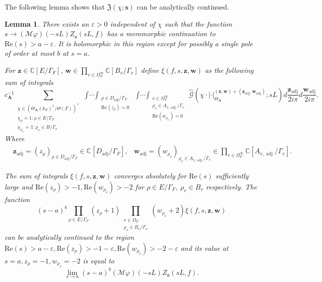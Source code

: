 \documentclass[a4paper,11pt,reqno]{amsart}
\newcommand{\C}{\mathbb{C}}
\newcommand{\A}{\mathbb{A}}
\DeclareMathOperator{\adj}{adj}
\renewcommand{\Re}{\mathrm{Re}}
\newtheorem{lemma}[theorem]{Lemma}
\theoremstyle{definition}
\begin{document}
The following lemma shows that $\mathfrak{Z}(\chi ; \bm{s})$ can be analytically continued.
\begin{lemma}\label{lem: Moving the contours}
	There exists an $\varepsilon > 0$ independent of $\chi$ such that the function $s \to (\mathcal{M} \varphi)(-sL )Z_{\mathfrak{a}}(s L, f)$ has a meromorphic continuation to $\Re(s) > a - \varepsilon$. It is holomorphic in this region except for possibly a single pole of order at most $b$ at $s = a$.
	
	For $\bm{z} \in \C[E / \Gamma_F]$, $\bm{w} \in \prod_{v \in \Omega_{F}^{\infty}} \C[B_v/\Gamma_v]$ define $\xi(f, s, \bm{z}, \bm{w})$ as the following sum of integrals
	\begin{equation}\label{eq:Definition of xi}
		c_{\mathbf{A}}^{-1}
		\sum_{\substack{\chi \in (\Theta_{\mathbf{A}}(\A_F)^1/\Theta(F))^{\vee} \\ \chi_{\rho} = 1: \rho \in E/\Gamma_F \\ \chi_{\rho_v} = 1: \rho_v \in B/\Gamma_v}}
		\mathop{\int \cdots \int}_{\substack{\rho \in D_{\adj} / \Gamma_F \\ \Re(z_{\rho}) = 0}}\mathop{\int \cdots \int}_{\substack{v \in \Omega_F^{\infty} \\ \rho_v \in A_{v, \adj} /\Gamma_v \\ \Re(w_{\rho_v}) = 0}} 
		\hat{\mathcal{G}}(\chi \cdot | \cdot|_{\Theta_{\mathbf{A}}}^{(\bm{z}, \bm{w}) + (\bm{z}_{\adj}, \bm{w}_{\adj})}; s L) d\frac{\bm{z}_{\adj}}{2 i \pi} d \frac{\bm{w}_{\adj}}{2 i \pi}.
	\end{equation}
	Where 
	\begin{align*}
		&\bm{z}_{\adj} = (z_{\rho})_{\rho \in D_{\adj} / \Gamma_F} \in \C[D_{\adj} / \Gamma_F], &\bm{w}_{\adj} = (w_{\rho_v})_{\rho_v \in A_{v, \adj}/\Gamma_v} \in \prod_{v \in \Omega_{F}^{\infty}} \C[A_{v, \adj}/\Gamma_v].
	\end{align*}
	
	The sum of integrals $\xi(f, s, \bm{z}, \bm{w})$ converges absolutely for $\Re(s)$ sufficiently large and $\Re(z_{\rho}) > -1, \Re(w_{\rho_v}) > -2$ for $\rho \in E/ \Gamma_F$, $\rho_v \in B_v$ respectively. The function 
	\[
	(s - a)^b \prod_{\rho \in E / \Gamma_F} (z_{\rho} + 1) \prod_{\substack{v \in \Omega_F \\ \rho_v \in B_v/\Gamma_v}} (w_{\rho_v} + 2)\xi(f, s, \bm{z}, \bm{w})
	\] 
	can be analytically continued to the region $\Re(s) > a - \varepsilon, \Re(z_{\rho}) > -1 - \varepsilon, \Re(w_{\rho_v}) > -2 - \varepsilon$ and its value at $s = a, z_{\rho} = -1, w_{\rho_v} = -2 $ is equal to 
	\[
	\lim_{s \to a} (s - a)^b (\mathcal{M} \varphi)(-sL )Z_{\mathfrak{a}}(s L, f).
	\]
	\end{lemma}
\end{document}
